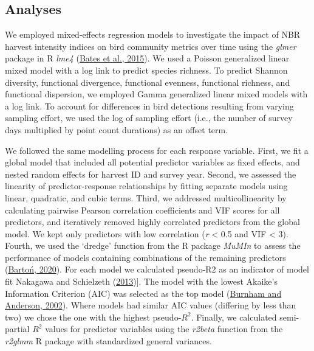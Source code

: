\documentclass[
  12pt,
]{article}
\begin{document}
\hypertarget{analyses}{%
\subsection{Analyses}\label{analyses}}

We employed mixed-effects regression models to investigate the impact of NBR harvest intensity indices on bird community metrics over time using the \emph{glmer} package in R \emph{lme4} (\protect\hyperlink{ref-batesFittingLinearMixedeffects2015}{Bates et al., 2015}). We used a Poisson generalized linear mixed model with a log link to predict species richness. To predict Shannon diversity, functional divergence, functional evenness, functional richness, and functional dispersion, we employed Gamma generalized linear mixed models with a log link. To account for differences in bird detections resulting from varying sampling effort, we used the log of sampling effort (i.e., the number of survey days multiplied by point count durations) as an offset term.

We followed the same modelling process for each response variable. First, we fit a global model that included all potential predictor variables as fixed effects, and nested random effects for harvest ID and survey year. Second, we assessed the linearity of predictor-response relationships by fitting separate models using linear, quadratic, and cubic terms. Third, we addressed multicollinearity by calculating pairwise Pearson correlation coefficients and VIF scores for all predictors, and iteratively removed highly correlated predictors from the global model. We kept only predictors with low correlation (\emph{r} \textless{} 0.5 and VIF \textless{} 3). Fourth, we used the `dredge' function from the R package \emph{MuMIn} to assess the performance of models containing combinations of the remaining predictors (\protect\hyperlink{ref-bartonMuMInMultimodelInference2020}{Bartoń, 2020}). For each model we calculated pseudo-R2 as an indicator of model fit Nakagawa and Schielzeth (\protect\hyperlink{ref-nakagawaGeneralSimpleMethod2013}{2013}){]}. The model with the lowest Akaike's Information Criterion (AIC) was selected as the top model (\protect\hyperlink{ref-burnhamModelSelectionMultimodel2002}{Burnham and Anderson, 2002}). Where models had similar AIC values (differing by less than two) we chose the one with the highest pseudo-\(R^2\). Finally, we calculated semi-partial \(R^2\) values for predictor variables using the \emph{r2beta} function from the \emph{r2glmm} R package with standardized general variances.
\end{document}
